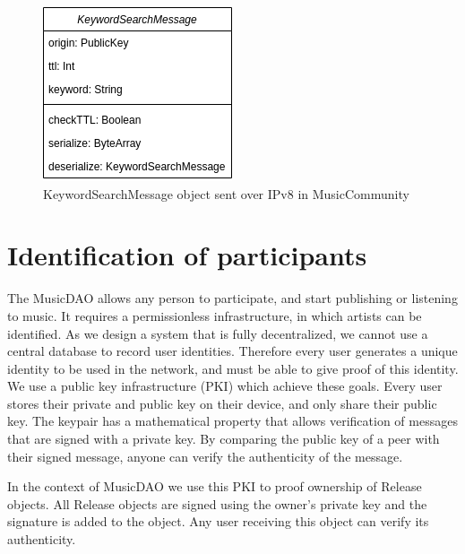 \begin{figure}
        \includegraphics[width=\linewidth]{design/KeywordSearchMessage-model.png}
        \caption{KeywordSearchMessage object sent over IPv8 in MusicCommunity}
        \label{fig:keyword-search-message-model}
    \endminipage\hfill
    \endminipage
\end{figure}

\section{Identification of participants}
\label{sec:pki-design}
The MusicDAO allows any person to participate, and start publishing or listening to music. It requires a permissionless infrastructure, in which artists can be identified. As we design a system that is fully decentralized, we cannot use a central database to record user identities. Therefore every user generates a unique identity to be used in the network, and must be able to give proof of this identity. We use a public key infrastructure (PKI) which achieve these goals. Every user stores their private and public key on their device, and only share their public key. The keypair has a mathematical property that allows verification of messages that are signed with a private key. By comparing the public key of a peer with their signed message, anyone can verify the authenticity of the message.

In the context of MusicDAO we use this PKI to proof ownership of Release objects. All Release objects are signed using the owner's private key and the signature is added to the object. Any user receiving this object can verify its authenticity.

